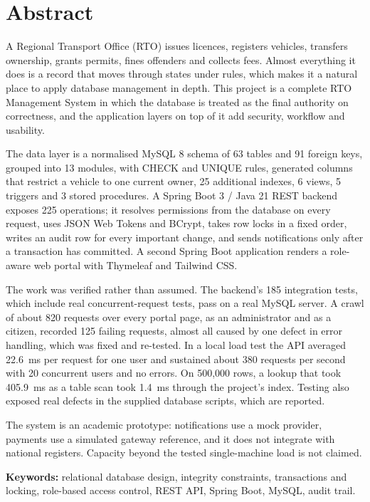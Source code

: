 \chapter*{Abstract}
\thispagestyle{plain}
A Regional Transport Office (RTO) issues licences, registers vehicles, transfers
ownership, grants permits, fines offenders and collects fees. Almost everything it does
is a record that moves through states under rules, which makes it a natural place to
apply database management in depth. This project is a complete RTO Management System in
which the database is treated as the final authority on correctness, and the
application layers on top of it add security, workflow and usability.

The data layer is a normalised MySQL 8 schema of 63 tables and 91 foreign keys, grouped
into 13 modules, with CHECK and UNIQUE rules, generated columns that restrict a
vehicle to one current owner, 25 additional indexes, 6 views, 5 triggers and 3 stored
procedures. A Spring Boot 3 / Java 21 REST backend exposes 225 operations; it resolves
permissions from the database on every request, uses JSON Web Tokens and BCrypt, takes
row locks in a fixed order, writes an audit row for every important change, and sends
notifications only after a transaction has committed. A second Spring Boot application
renders a role-aware web portal with Thymeleaf and Tailwind CSS.

The work was verified rather than assumed. The backend's 185 integration tests, which
include real concurrent-request tests, pass on a real MySQL server. A crawl of about
820 requests over every portal page, as an administrator and as a citizen, recorded 125
failing requests, almost all caused by one defect in error handling, which was fixed and re-tested. In a
local load test the API averaged 22.6~ms per request for one user and sustained about
380 requests per second with 20 concurrent users and no errors. On 500,000 rows, a
lookup that took 405.9~ms as a table scan took 1.4~ms through the project's index.
Testing also exposed real defects in the supplied database scripts, which are reported.

The system is an academic prototype: notifications use a mock provider, payments use a
simulated gateway reference, and it does not integrate with national registers.
Capacity beyond the tested single-machine load is not claimed.

\vspace{0.6cm}
\textbf{Keywords:} relational database design, integrity constraints, transactions and
locking, role-based access control, REST API, Spring Boot, MySQL, audit trail.
\clearpage
